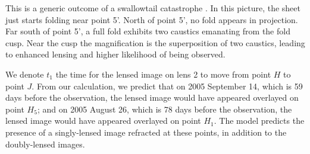 \documentclass[useAMS,usenatbib]{mn2e}
\begin{document}
This is a generic outcome of a swallowtail
catastrophe \citep{Arnold1990}. In this picture, the sheet just
starts folding near point 5'.  North of point 5', no fold appears in
projection.  Far south of point 5', a full fold exhibits two caustics
emanating from the fold cusp.  Near the cusp the magnification is the
superposition of two caustics, leading to enhanced lensing and higher
likelihood of being observed.  

We denote $t_1$ the time for the lensed image on lens 2 to move from point
$H$ to point $J$. From our calculation, we predict that on 2005 September 14, which is 59 days before the observation, the lensed image would have appeared overlayed on point $H_5$; and on 2005 August 26, which is 78 days before the observation, the lensed image would have appeared overlayed on point $H_1$.
The
model predicts the presence of a singly-lensed image refracted at
these points, in addition to the doubly-lensed images.

\end{document}
